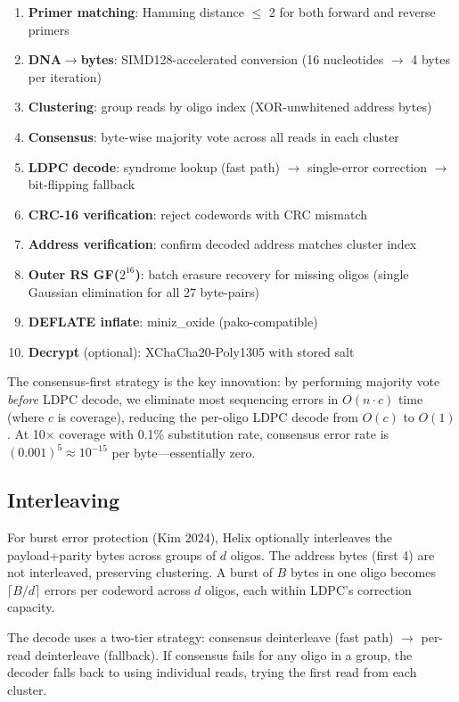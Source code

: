 \documentclass[11pt,a4paper]{article}
\begin{document}
\begin{enumerate}[noitemsep]
\item \textbf{Primer matching}: Hamming distance $\leq$ 2 for both forward and reverse primers
\item \textbf{DNA$\to$bytes}: SIMD128-accelerated conversion (16 nucleotides $\to$ 4 bytes per iteration)
\item \textbf{Clustering}: group reads by oligo index (XOR-unwhitened address bytes)
\item \textbf{Consensus}: byte-wise majority vote across all reads in each cluster
\item \textbf{LDPC decode}: syndrome lookup (fast path) $\to$ single-error correction $\to$ bit-flipping fallback
\item \textbf{CRC-16 verification}: reject codewords with CRC mismatch
\item \textbf{Address verification}: confirm decoded address matches cluster index
\item \textbf{Outer RS GF($2^{16}$)}: batch erasure recovery for missing oligos (single Gaussian elimination for all 27 byte-pairs)
\item \textbf{DEFLATE inflate}: miniz\_oxide (pako-compatible)
\item \textbf{Decrypt} (optional): XChaCha20-Poly1305 with stored salt
\end{enumerate}

The consensus-first strategy is the key innovation: by performing majority vote \emph{before} LDPC decode, we eliminate most sequencing errors in $O(n \cdot c)$ time (where $c$ is coverage), reducing the per-oligo LDPC decode from $O(c)$ to $O(1)$. At 10$\times$ coverage with 0.1\% substitution rate, consensus error rate is $(0.001)^5 \approx 10^{-15}$ per byte---essentially zero.

\subsection{Interleaving}

For burst error protection (Kim 2024), Helix optionally interleaves the payload+parity bytes across groups of $d$ oligos. The address bytes (first 4) are not interleaved, preserving clustering. A burst of $B$ bytes in one oligo becomes $\lceil B/d \rceil$ errors per codeword across $d$ oligos, each within LDPC's correction capacity.

The decode uses a two-tier strategy: consensus deinterleave (fast path) $\to$ per-read deinterleave (fallback). If consensus fails for any oligo in a group, the decoder falls back to using individual reads, trying the first read from each cluster.
\end{document}
